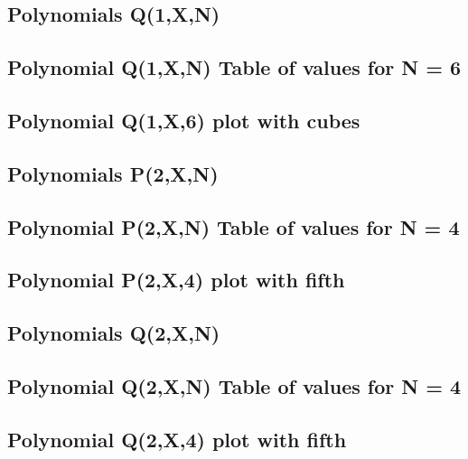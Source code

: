 \documentclass[12pt,letterpaper,oneside,reqno]{amsart}
\begin{document}

    \subsection{Polynomials Q(1,X,N)}
    

    \subsection{Polynomial Q(1,X,N) Table of values for N = 6}
    

    \subsection{Polynomial Q(1,X,6) plot with cubes}
    


    \subsection{Polynomials P(2,X,N)}
    

    \subsection{Polynomial P(2,X,N) Table of values for N = 4}
    

    \subsection{Polynomial P(2,X,4) plot with fifth}
    


    \subsection{Polynomials Q(2,X,N)}
    

    \subsection{Polynomial Q(2,X,N) Table of values for N = 4}
    

    \subsection{Polynomial Q(2,X,4) plot with fifth}
    
\end{document}
